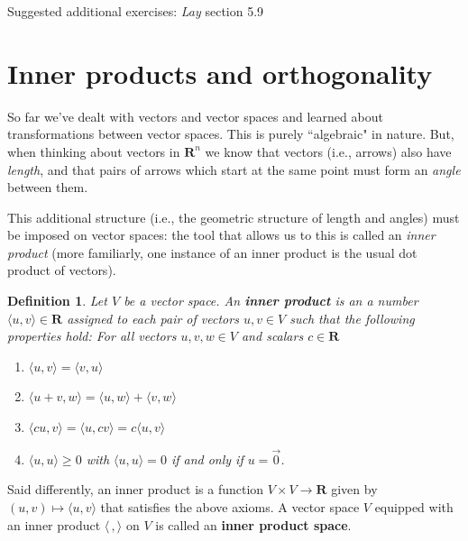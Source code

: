 \documentclass[12pt]{article}
\numberwithin{equation}{subsection}
\numberwithin{figure}{subsection}
\newtheorem{defn}[subsection]{Definition}
\theoremstyle{note}
\newcommand{\R}{\mathbf{R}}
\newcommand\ip[2]{\langle #1, #2\rangle}
\begin{document}
Suggested additional exercises: \textit{Lay} section 5.9



\section{Inner products and orthogonality}
So far we've dealt with vectors and vector spaces and learned about transformations between vector spaces. This is purely ``algebraic" in nature. But, when thinking about vectors in $\R^n$ we know that vectors (i.e., arrows) also have \textit{length}, and that pairs of arrows which start at the same point must form an \textit{angle} between them. 

This additional structure (i.e., the geometric structure of length and angles) must be imposed on vector spaces: the tool that allows us to this is called an \textit{inner product} (more familiarly, one instance of an inner product is the usual dot product of vectors). 


\begin{defn} Let $V$ be a vector space. An \textbf{inner product} is an a number $\ip{u}{v}\in \R$ assigned to each pair of vectors $u,v\in V$ such that the following properties hold: For all vectors $u,v,w\in V$ and scalars $c\in \R$
\begin{enumerate}
	\item $\ip{u}{v}=\ip{v}{u}$
	\item $\ip{u+v}{w}=\ip{u}{w}+\ip{v}{w}$
	\item $\ip{cu}{v}=\ip{u}{cv}=c\ip{u}{v}$
	\item $\ip{u}{u}\geq 0$ with $\ip{u}{u}=0$ if and only if $u=\vec{0}$.
\end{enumerate}
\end{defn}
Said differently, an inner product is a function $V\times V\to \R$ given by $(u,v)\mapsto \ip{u}{v}$ that satisfies the above axioms. A vector space $V$ equipped with an inner product $\ip{\,}{}$ on $V$ is called an \textbf{inner product space}.
\end{document}

